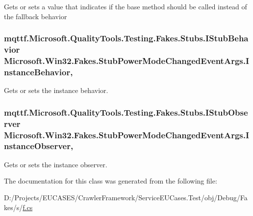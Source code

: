 Gets or sets a value that indicates if the base method should be called instead of the fallback behavior

\hypertarget{class_microsoft_1_1_win32_1_1_fakes_1_1_stub_power_mode_changed_event_args_a3138497663d0c1d129583d2379d0baaf}{
\subsubsection[{Instance\-Behavior}]{\setlength{\rightskip}{0pt plus 5cm}mqttf.\-Microsoft.\-Quality\-Tools.\-Testing.\-Fakes.\-Stubs.\-I\-Stub\-Behavior Microsoft.\-Win32.\-Fakes.\-Stub\-Power\-Mode\-Changed\-Event\-Args.\-Instance\-Behavior\hspace{0.3cm}{\ttfamily [get]}, {\ttfamily [set]}}}\label{class_microsoft_1_1_win32_1_1_fakes_1_1_stub_power_mode_changed_event_args_a3138497663d0c1d129583d2379d0baaf}


Gets or sets the instance behavior.

\hypertarget{class_microsoft_1_1_win32_1_1_fakes_1_1_stub_power_mode_changed_event_args_a96847960e6f11d1892d5b9be2229b56b}{
\subsubsection[{Instance\-Observer}]{\setlength{\rightskip}{0pt plus 5cm}mqttf.\-Microsoft.\-Quality\-Tools.\-Testing.\-Fakes.\-Stubs.\-I\-Stub\-Observer Microsoft.\-Win32.\-Fakes.\-Stub\-Power\-Mode\-Changed\-Event\-Args.\-Instance\-Observer\hspace{0.3cm}{\ttfamily [get]}, {\ttfamily [set]}}}\label{class_microsoft_1_1_win32_1_1_fakes_1_1_stub_power_mode_changed_event_args_a96847960e6f11d1892d5b9be2229b56b}


Gets or sets the instance observer.



The documentation for this class was generated from the following file\-:\begin{DoxyCompactItemize}
\item 
D\-:/\-Projects/\-E\-U\-C\-A\-S\-E\-S/\-Crawler\-Framework/\-Service\-E\-U\-Cases.\-Test/obj/\-Debug/\-Fakes/s/\hyperlink{s_2f_8cs}{f.\-cs}\end{DoxyCompactItemize}

